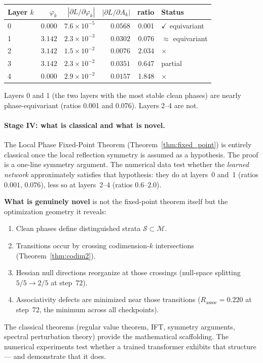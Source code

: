 \documentclass[11pt]{amsart}
\begin{document}
\begin{center}
\small
\begin{tabular}{@{}lrrrrl@{}}
\toprule
Layer $k$ & $\varphi_k$ & $|\partial L/\partial\varphi_k|$
         & $|\partial L/\partial A_k|$ & ratio & Status \\
\midrule
0 & $0.000$ & $7.6\times10^{-5}$ & $0.0568$ & 0.001 & $\checkmark$ equivariant \\
1 & $3.142$ & $2.3\times10^{-3}$ & $0.0302$ & 0.076 & $\approx$ equivariant \\
2 & $3.142$ & $1.5\times10^{-2}$ & $0.0076$ & 2.034 & $\times$ \\
3 & $3.142$ & $2.3\times10^{-2}$ & $0.0351$ & 0.647 & partial \\
4 & $0.000$ & $2.9\times10^{-2}$ & $0.0157$ & 1.848 & $\times$ \\
\bottomrule
\end{tabular}
\end{center}

Layers 0 and 1 (the two layers with the most stable clean phases)
are nearly phase-equivariant (ratios 0.001 and 0.076).
Layers 2--4 are not.

\paragraph{Stage IV: what is classical and what is novel.}
The Local Phase Fixed-Point Theorem (Theorem~\ref{thm:fixed_point})
is entirely classical once the local reflection symmetry is assumed
as a hypothesis.
The proof is a one-line symmetry argument.
The numerical data test whether the \emph{learned network}
approximately satisfies that hypothesis: they do at layers~0 and~1
(ratios $0.001$, $0.076$), less so at layers~2--4 (ratios $0.6$--$2.0$).

\textbf{What is genuinely novel} is not the fixed-point theorem itself
but the optimization geometry it reveals:
\begin{enumerate}
\item Clean phases define distinguished strata $\mathcal{S} \subset \mathcal{M}$.
\item Transitions occur by crossing codimension-$k$ intersections
  (Theorem~\ref{thm:codim2}).
\item Hessian null directions reorganize at those crossings
  (null-space splitting $5/5\to2/5$ at step~72).
\item Associativity defects are minimized near those transitions
  ($R_\mathrm{assoc} = 0.220$ at step~72, the minimum across all checkpoints).
\end{enumerate}
The classical theorems (regular value theorem, IFT, symmetry arguments,
spectral perturbation theory) provide the mathematical scaffolding.
The numerical experiments test whether a trained transformer
exhibits that structure --- and demonstrate that it does.
\end{document}
